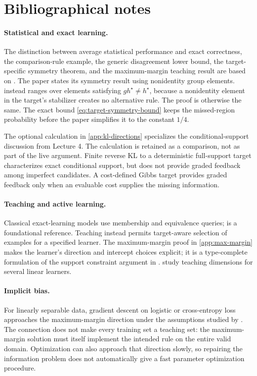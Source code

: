 \documentclass[11pt,twoside]{article}
\theoremstyle{definition}
\theoremstyle{remark}
\begin{document}
\printendnotes

\section*{Bibliographical notes}

\paragraph{Statistical and exact learning.}
The distinction between average statistical performance and exact correctness,
the comparison-rule example, the generic disagreement lower bound, the
target-specific symmetry theorem, and the maximum-margin teaching result are
based on \citet{gyorgy2025}. The paper states its symmetry result using
nonidentity group elements.  instead ranges over
elements satisfying \(gh^\star\ne h^\star\), because a nonidentity element in
the target's stabilizer creates no alternative rule. The proof is otherwise the
same. The exact bound \cref{eq:target-symmetry-bound} keeps the missed-region
probability before the paper simplifies it to the constant \(1/4\).

The optional calculation in \cref{app:kl-directions} specializes the
conditional-support discussion from Lecture 4. The calculation is retained as
a comparison, not as part of the live argument. Finite reverse KL to a
deterministic full-support target characterizes exact conditional support, but
does not provide graded feedback among imperfect candidates. A cost-defined
Gibbs target provides graded feedback only when an evaluable cost supplies the
missing information.

\paragraph{Teaching and active learning.}
Classical exact-learning models use membership and equivalence queries;
\citet{angluin1988} is a foundational reference. Teaching instead permits
target-aware selection of examples for a specified learner. The
maximum-margin proof in \cref{app:max-margin} makes the learner's direction and
intercept choices explicit; it is a type-complete formulation of the support
constraint argument in \citet{gyorgy2025}. \citet{liu2016} study teaching
dimensions for several linear learners.

\paragraph{Implicit bias.}
For linearly separable data, gradient descent on logistic or cross-entropy loss
approaches the maximum-margin direction under the assumptions studied by
\citet{soudry2018}. The connection does not make every training set a teaching
set: the maximum-margin solution must itself implement the intended rule on
the entire valid domain. Optimization can also approach that direction slowly,
so repairing the information problem does not automatically give a fast
parameter optimization procedure.
\end{document}
